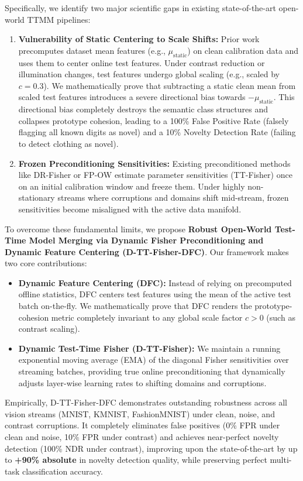 \documentclass{article}
\theoremstyle{plain}
\theoremstyle{definition}
\theoremstyle{remark}
\begin{document}
Specifically, we identify two major scientific gaps in existing state-of-the-art open-world TTMM pipelines:
\begin{enumerate}
  \item \textbf{Vulnerability of Static Centering to Scale Shifts:} Prior work precomputes dataset mean features (e.g., $\mu_{\text{static}}$) on clean calibration data and uses them to center online test features. Under contrast reduction or illumination changes, test features undergo global scaling (e.g., scaled by $c = 0.3$). We mathematically prove that subtracting a static clean mean from scaled test features introduces a severe directional bias towards $-\mu_{\text{static}}$. This directional bias completely destroys the semantic class structures and collapses prototype cohesion, leading to a 100\% False Positive Rate (falsely flagging all known digits as novel) and a 10\% Novelty Detection Rate (failing to detect clothing as novel).
  \item \textbf{Frozen Preconditioning Sensitivities:} Existing preconditioned methods like DR-Fisher \cite{dr_fisher} or FP-OW \cite{fp_ow} estimate parameter sensitivities (TT-Fisher) once on an initial calibration window and freeze them. Under highly non-stationary streams where corruptions and domains shift mid-stream, frozen sensitivities become misaligned with the active data manifold.
\end{enumerate}

To overcome these fundamental limits, we propose \textbf{Robust Open-World Test-Time Model Merging via Dynamic Fisher Preconditioning and Dynamic Feature Centering (D-TT-Fisher-DFC)}. Our framework makes two core contributions:
\begin{itemize}
  \item \textbf{Dynamic Feature Centering (DFC):} Instead of relying on precomputed offline statistics, DFC centers test features using the mean of the active test batch on-the-fly. We mathematically prove that DFC renders the prototype-cohesion metric completely invariant to any global scale factor $c > 0$ (such as contrast scaling).
  \item \textbf{Dynamic Test-Time Fisher (D-TT-Fisher):} We maintain a running exponential moving average (EMA) of the diagonal Fisher sensitivities over streaming batches, providing true online preconditioning that dynamically adjusts layer-wise learning rates to shifting domains and corruptions.
\end{itemize}

Empirically, D-TT-Fisher-DFC demonstrates outstanding robustness across all vision streams (MNIST, KMNIST, FashionMNIST) under clean, noise, and contrast corruptions. It completely eliminates false positives (0\% FPR under clean and noise, 10\% FPR under contrast) and achieves near-perfect novelty detection (100\% NDR under contrast), improving upon the state-of-the-art by up to \textbf{+90\% absolute} in novelty detection quality, while preserving perfect multi-task classification accuracy.
\end{document}
